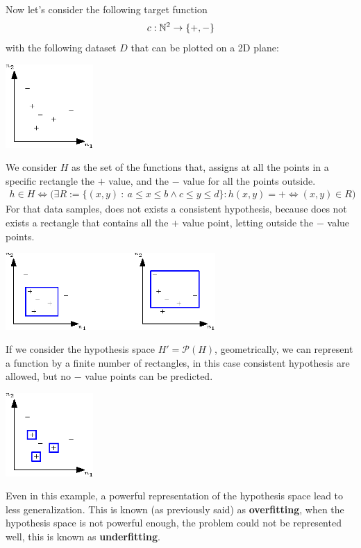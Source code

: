 \documentclass[10pt, letterpaper]{report}
\begin{document}
Now let's consider the following target function\begin{equation}
    c:{\mathbb N}^2\rightarrow\{+,-\}
\end{equation}
with the following dataset $D$ that can be plotted on a 2D plane:\begin{center}
    \includegraphics[width=0.25\textwidth]{images/N2_hypothesis_1.eps} 
\end{center}
We consider $H$ as the set of the functions that, assigns at all the points in a specific rectangle the $+$ value, and the $-$ value for all the points outside.
\begin{eqnarray*}
    h\in H \iff\Big( \exists R:=\{(x,y) \ : \ a\le x\le b\land c\le y\le d\} : h(x,y)=+\iff (x,y)\in R\Big )
\end{eqnarray*}
For that data samples, does not exists a consistent hypothesis, because does not exists a rectangle that contains all the $+$ value point, letting outside the $-$ value points.
\begin{center}
    \includegraphics[width=0.6\textwidth]{images/N2_hypothesis_2.eps} 
\end{center}
If we consider the hypothesis space $H'=\mathcal P(H)$, geometrically, we can represent a function by a finite number of rectangles, in this case consistent hypothesis are allowed, but no $-$ value points can be predicted.
\begin{center}
    \includegraphics[width=0.25\textwidth]{images/N2_hypothesis_3.eps} 
\end{center}
Even in this example, a powerful representation of the hypothesis space lead to less generalization. This is known (as previously said) as \textbf{overfitting}, when the hypothesis space is not powerful enough, the problem could not be represented well, this is known as \textbf{underfitting}.\bigskip
\end{document}
